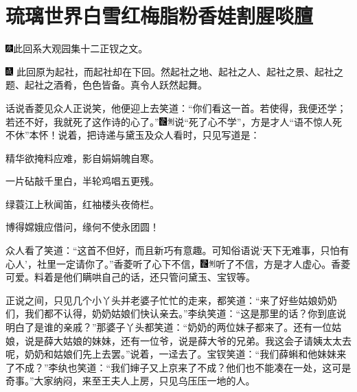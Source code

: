 

\chapter{琉璃世界白雪红梅\hspace{.5em}脂粉香娃割腥啖膻}

{\includegraphics[width=3mm]{../Images/00004}此回系大观园集十二正钗之文。}

{\includegraphics[width=3mm]{../Images/00005}  \kaishu 此回原为起社，而起社却在下回。然起社之地、起社之人、起社之景、起社之题、起社之酒肴，色色皆备。真令人跃然起舞。}

话说香菱见众人正说笑，他便迎上去笑道：``你们看这一首。若使得，我便还学；若还不好，我就死了这作诗的心了。''{\includegraphics[width=3mm]{../Images/00006}\includegraphics[width=3mm]{../Images/00011}\footnotesize \kaishu 说``死了心不学''，方是才人``语不惊人死不休''本怀！}说着，把诗递与黛玉及众人看时，只见写道是：

精华欲掩料应难，影自娟娟魄自寒。

一片砧敲千里白，半轮鸡唱五更残。

绿蓑江上秋闻笛，红袖楼头夜倚栏。

博得嫦娥应借问，缘何不使永团圆！

众人看了笑道：``这首不但好，而且新巧有意趣。可知俗语说`天下无难事，只怕有心人'，社里一定请你了。''香菱听了心下不信，{\includegraphics[width=3mm]{../Images/00006}\includegraphics[width=3mm]{../Images/00011}\footnotesize \kaishu 听了不信，方是才人虚心。香菱可爱。}料着是他们瞒哄自己的话，还只管问黛玉、宝钗等。

正说之间，只见几个小丫头并老婆子忙忙的走来，都笑道：``来了好些姑娘奶奶们，我们都不认得，奶奶姑娘们快认亲去。''李纨笑道：``这是那里的话？你到底说明白了是谁的亲戚？''那婆子丫头都笑道：``奶奶的两位妹子都来了。还有一位姑娘，说是薛大姑娘的妹妹，还有一位爷，说是薛大爷的兄弟。我这会子请姨太太去呢，奶奶和姑娘们先上去罢。''说着，一迳去了。宝钗笑道：``我们薛蝌和他妹妹来了不成？''李纨也笑道：``我们婶子又上京来了不成？他们也不能凑在一处，这可是奇事。''大家纳闷，来至王夫人上房，只见乌压压一地的人。

